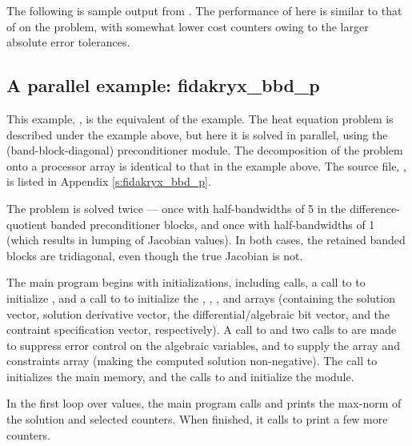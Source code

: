 The following is sample output from .
The performance of {\fida} here is similar to that of {\ida} on
the  problem, with somewhat lower cost counters owing to
the larger absolute error tolerances.



\subsection{A parallel example: fidakryx\_bbd\_p}\label{ss:fidakryx_bbd_p}

This example, , is the {\F} equivalent of the
 example.  The heat equation problem is described
under the  example above, but here it is solved in
parallel, using the {\idabbdpre} (band-block-diagonal) preconditioner
module.  The decomposition of the problem onto a processor array is
identical to that in the  example above.  The source file,
, is listed in Appendix \ref{s:fidakryx_bbd_p}.

The problem is solved twice --- once with half-bandwidths of 5 in the
difference-quotient banded preconditioner blocks, and once with
half-bandwidths of 1 (which results in lumping of Jacobian values).
In both cases, the retained banded blocks are tridiagonal, even though
the true Jacobian is not.

The main program begins with initializations, including {\mpi} calls,
a call to  to initialize {\nvecp}, and a call to
 to initialize the , , , and
 arrays (containing the solution vector, solution derivative vector,
the differential/algebraic bit vector, and the contraint specification
vector, respectively).  A call to  and two calls to
 are made to suppress error control on the algebraic
variables, and to supply the  array and constraints array (making
the computed solution non-negative).  The call to 
initializes the {\fida} main memory, and the calls to 
and  initialize the {\fidabbd} module.

In the first loop over  values, the main program calls 
and prints the max-norm of the solution and selected counters.  When finished,
it calls  to print a few more counters.

